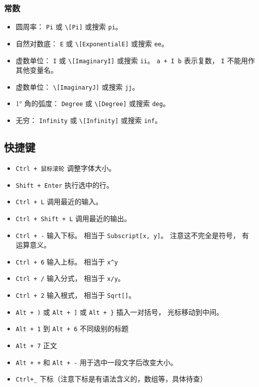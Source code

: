 \subsubsection{常数}

\begin{itemize}
\item 圆周率： \verb`Pi` 或 \verb`\[Pi]` 或搜索 \verb`pi`。
\item 自然对数底： \verb`E` 或 \verb`\[ExponentialE]` 或搜索 \verb`ee`。
\item 虚数单位： \verb`I` 或 \verb`\[ImaginaryI]` 或搜索 \verb`ii`。 \verb`a + I b` 表示复数， \verb`I` 不能用作其他变量名。
\item 虚数单位： \verb`\[ImaginaryJ]` 或搜索 \verb`jj`。
\item 1° 角的弧度： \verb`Degree` 或 \verb`\[Degree]` 或搜索 \verb`deg`。
\item 无穷： \verb`Infinity` 或 \verb`\[Infinity]` 或搜索 \verb`inf`。
\end{itemize}

\subsection{快捷键}
\begin{itemize}
\item \verb`Ctrl + 鼠标滚轮` 调整字体大小。
\item \verb`Shift + Enter` 执行选中的行。
\item \verb`Ctrl + L` 调用最近的输入。
\item \verb`Ctrl + Shift + L` 调用最近的输出。
\item \verb`Ctrl + -` 输入下标。 相当于 \verb`Subscript[x, y]`。 注意这不完全是符号， 有运算意义。
\item \verb`Ctrl + 6` 输入上标。 相当于 \verb`x^y`
\item \verb`Ctrl + /` 输入分式， 相当于 \verb`x/y`。
\item \verb`Ctrl + 2` 输入根式， 相当于 \verb`Sqrt[]`。
\item \verb`Alt + )` 或 \verb`Alt + ]` 或 \verb`Alt + }` 插入一对括号， 光标移动到中间。
\item \verb`Alt + 1` 到 \verb`Alt + 6` 不同级别的标题
\item \verb`Alt + 7` 正文
\item \verb`Alt + +` 和 \verb`Alt + -` 用于选中一段文字后改变大小。
\item \verb`Ctrl+_` 下标（注意下标是有语法含义的，数组等，具体待查）
\end{itemize}

